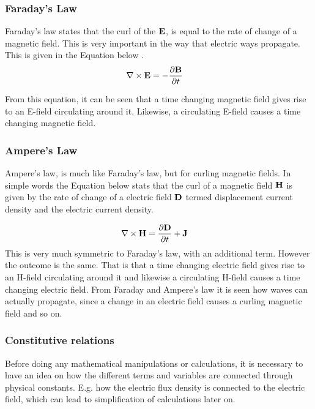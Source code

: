 \subsubsection{Faraday's Law}
Faraday's law states that the curl of the $\bold{E}$, is equal to the rate of change of a magnetic field. This is very important in the way that electric ways propagate. This is given in the Equation below \cite{taflove2000computional}. 
\begin{align}
\nabla \times \bold{E} &= - \frac{\partial \bold{B}}{\partial t}
\end{align}

From this equation, it can be seen that a time changing magnetic field gives rise to an E-field circulating around it. Likewise, a circulating E-field causes a time changing magnetic field.   

\subsubsection{Ampere's Law}
Ampere's law, is much like Faraday's law, but for curling magnetic fields. In simple words the Equation below stats that the curl of a magnetic field $\bold{H}$ is given by the rate of change of a electric field $\bold{D}$ termed displacement current density and the electric current density\cite{taflove2000computional}.

\begin{align}
\nabla \times \bold{H} &= \frac{\partial \bold{D}}{\partial t} + \bold{J} 
\end{align}
This is very much symmetric to Faraday's law, with an additional term. However the outcome is the same. That is that a time changing electric field gives rise to an H-field circulating around it and likewise a circulating H-field causes a time changing electric field. From Faraday and Ampere's law it is seen how waves can actually propagate, since a change in an electric field causes a curling magnetic field and so on.    

\subsubsection{Constitutive relations}
Before doing any mathematical manipulations or calculations, it is necessary to have an idea on how the different terms and variables are connected through physical constants. E.g. how the electric flux density is connected to the electric field, which can lead to simplification of calculations later on.

